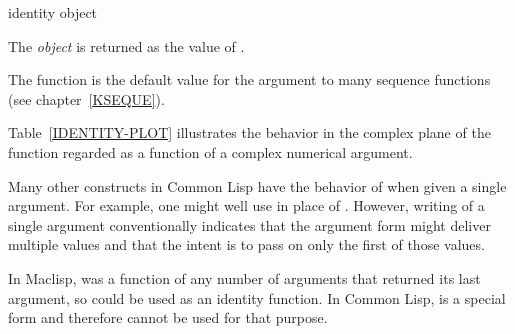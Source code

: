 \begin{defun}[Function]
identity object

The {\it object} is returned as the value of .

\begin{new}
The  function is the default value for the 
argument to many sequence functions (see chapter~\ref{KSEQUE}).

Table~\ref{IDENTITY-PLOT} illustrates the behavior in the complex plane
of the
 function regarded as a function of a complex numerical argument.

Many other constructs in Common Lisp have the behavior of 
when given a single argument.  For example, one might well use 
in place of .  However, writing  of a single
argument conventionally indicates that the argument form might deliver
multiple values and that the intent is to pass on only the first of
those values.

\beforenoterule
\begin{incompatibility}
In Maclisp,  was a function of any number of arguments that
returned its last argument,
so  could be used as an identity function.
In Common Lisp,  is a special form and therefore cannot be used for
that purpose.
\end{incompatibility}
\afternoterule
\end{new}
\end{defun}
